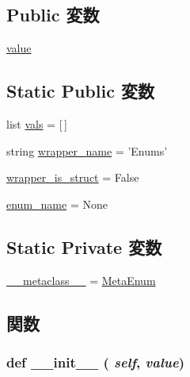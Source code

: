\subsection*{Public 変数}
\begin{DoxyCompactItemize}
\item 
\hyperlink{classm5_1_1params_1_1Enum_afcc7a4b78ecd8fa7e713f8cfa0f51017}{value}
\end{DoxyCompactItemize}
\subsection*{Static Public 変数}
\begin{DoxyCompactItemize}
\item 
list \hyperlink{classm5_1_1params_1_1Enum_ac8dfdb1d5e96e93836fb573bc3cd2110}{vals} = \mbox{[}$\,$\mbox{]}
\item 
string \hyperlink{classm5_1_1params_1_1Enum_a8d8e670fd263dbfded71859e88b6ac8b}{wrapper\_\-name} = 'Enums'
\item 
\hyperlink{classm5_1_1params_1_1Enum_a774c4f5a238e6bd6cc19b2ad18ec0f4f}{wrapper\_\-is\_\-struct} = False
\item 
\hyperlink{classm5_1_1params_1_1Enum_a8c2dc4d96bdbbac20face743a1c0f909}{enum\_\-name} = None
\end{DoxyCompactItemize}
\subsection*{Static Private 変数}
\begin{DoxyCompactItemize}
\item 
\hyperlink{classm5_1_1params_1_1Enum_adfc4d1824f4ecdcbb04ceafc5bbc933e}{\_\-\_\-metaclass\_\-\_\-} = \hyperlink{classm5_1_1params_1_1MetaEnum}{MetaEnum}
\end{DoxyCompactItemize}


\subsection{関数}
\hypertarget{classm5_1_1params_1_1Enum_ac775ee34451fdfa742b318538164070e}{
\subsubsection[{\_\-\_\-init\_\-\_\-}]{\setlength{\rightskip}{0pt plus 5cm}def \_\-\_\-init\_\-\_\- ( {\em self}, \/   {\em value})}}
\label{classm5_1_1params_1_1Enum_ac775ee34451fdfa742b318538164070e}




